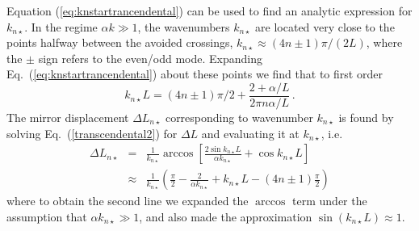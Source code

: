 \documentclass[twocolumn,english,pra,aps,superscriptaddress,floatfix]{revtex4-1}
\begin{document}
Equation (\ref{eq:knstartrancendental}) can be used to find an analytic expression for $k_{n \star}$.
In the regime $\alpha k \gg 1$, the wavenumbers $k_{n \star}$ are located very close to the points halfway between the avoided crossings, $k_{n \star} \approx (4n \pm 1) \pi/(2L)$, where the $\pm$ sign refers to the even/odd mode. Expanding Eq.\ (\ref{eq:knstartrancendental}) about these points we find that to first order 
\begin{equation}
k_{n \star}L= (4n\pm1) \pi/2 +\frac{2+\alpha/L}{2 \pi n \alpha/L }
\, .
\label{x_0}
\end{equation}
The mirror displacement $\Delta L_{n \star}$ corresponding to wavenumber $k_{n \star}$ is found by solving Eq.\ (\ref{transcendental2}) for $\Delta L$ and evaluating it at $k_{n \star}$, i.e.\
\begin{eqnarray}
\Delta L_{n \star} & = & \frac{1}{k_{n \star}}\arccos \left[\frac{2\sin k_{n \star}L}{\alpha k_{n \star}}+\cos k_{n \star} L \right] 
 \\
& \approx & \frac{1}{k_{n\star}}\left(\frac{\pi}{2}
-\frac{2}{\alpha k_{n\star}}+k_{n\star}L-(4n\pm1)\frac{\pi}{2}\right) \label{L_0}
\end{eqnarray}
where to obtain the  second line we expanded the $\arccos$ term under the assumption that $\alpha k_{n \star} \gg 1$, and also made the approximation $\sin (k_{n \star} L) \approx 1$.
\end{document}

